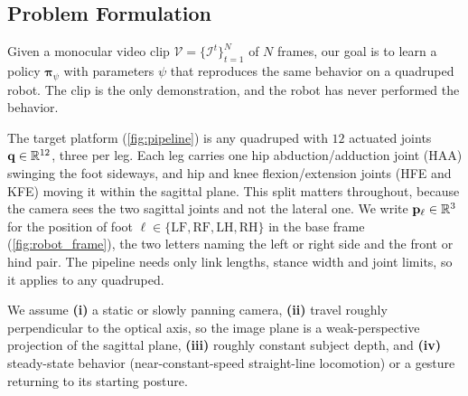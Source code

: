 \documentclass[letterpaper, 10 pt, conference]{ieeeconf}
\newcommand{\video}{\mathcal{V}}
\newcommand{\image}{\mathcal{I}}
\newcommand{\clipTime}{N}
\newcommand{\indexTime}{t}
\newcommand{\policy}{\boldsymbol{\pi}}
\begin{document}
\section{\ourMethod}\label{sec:method}

\subsection{Problem Formulation}
\noindent
Given a monocular video clip $\video= \{ \image^\indexTime \}_{\indexTime=1}^{\clipTime}$ of $\clipTime$ frames, our goal is to learn a policy $\policy_\psi$ with parameters $\psi$ that reproduces the same behavior on a quadruped robot. The clip is the only demonstration, and the robot has never performed the behavior.

The target platform (\autoref{fig:pipeline}) is any quadruped with $12$ actuated joints $\mathbf{q}\in\mathbb{R}^{12}$, three per leg. Each leg carries one hip abduction/adduction joint (HAA) swinging the foot sideways, and hip and knee flexion/extension joints (HFE and KFE) moving it within the sagittal plane. This split matters throughout, because the camera sees the two sagittal joints and not the lateral one.
We write $\mathbf{p}_\ell\in\mathbb{R}^3$ for the position of foot $\ell\in\{\mathrm{LF},\mathrm{RF},\mathrm{LH},\mathrm{RH}\}$ in the base frame (\autoref{fig:robot_frame}), the two letters naming the left or right side and the front or hind pair. The pipeline needs only link lengths, stance width and joint limits, so it applies to any quadruped.

We assume \textbf{(i)} a static or slowly panning camera, \textbf{(ii)} travel roughly perpendicular to the optical axis, so the image plane is a weak-perspective projection of the sagittal plane, \textbf{(iii)} roughly constant subject depth, and \textbf{(iv)} steady-state behavior (near-constant-speed straight-line locomotion) or a gesture returning to its starting posture. 


\end{document}
